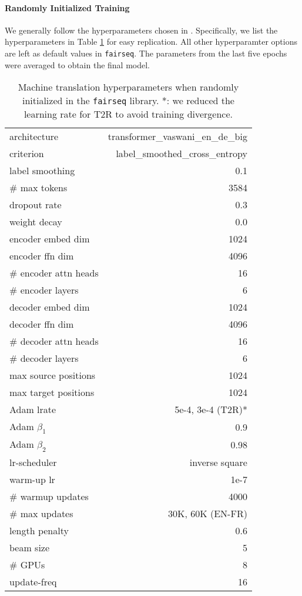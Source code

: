 \documentclass[11pt]{article}
\newcommand{\TRNN}{T2R\xspace}
\begin{document}
\paragraph{Randomly Initialized Training}
We generally follow the hyperparameters chosen in \citet{Vaswani2017AttentionIA, Ott2018ScalingNM}.
Specifically, we list the hyperparameters in Table \ref{tab:mt-hyp} for easy replication. All other hyperparamter options are left as default values in \texttt{fairseq}.
The parameters from the last five epochs were averaged to obtain the final model.


\begin{table}[h]
\small
\centering
\begin{tabular}{ |l r|}
\hline
architecture & transformer\_vaswani\_en\_de\_big\\
criterion & label\_smoothed\_cross\_entropy\\
label smoothing & 0.1\\
\# max tokens & 3584 \\
dropout rate & 0.3\\
weight decay & 0.0 \\
encoder embed dim  & 1024\\
encoder ffn dim  & 4096\\
\# encoder attn heads & 16\\
\# encoder layers & 6 \\
decoder embed dim  & 1024\\
decoder ffn dim  & 4096\\
\# decoder attn heads & 16\\
\# decoder layers & 6 \\
max source positions & 1024 \\
max target positions & 1024 \\
Adam lrate& 5e-4, 3e-4 (\TRNN)*\\
Adam $\beta_1$& 0.9\\
Adam $\beta_2$& 0.98\\
lr-scheduler &  inverse square \\
warm-up lr & 1e-7 \\
\# warmup updates & 4000 \\
\# max updates &  30K, 60K (EN-FR) \\
length penalty & 0.6\\
beam size & 5\\
\# GPUs & 8 \\
update-freq & 16\\
\hline
\end{tabular}
\caption{Machine translation hyperparameters when randomly initialized in the \texttt{fairseq} library. *: we reduced the learning rate for \TRNN to avoid training divergence.}
\label{tab:mt-hyp}
\end{table}
\end{document}
